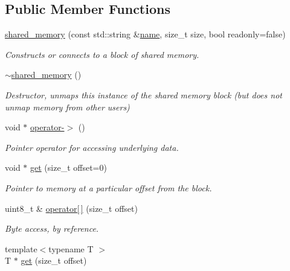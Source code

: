 \subsection*{Public Member Functions}
\begin{DoxyCompactItemize}
\item 
\hyperlink{classcpen333_1_1process_1_1windows_1_1shared__memory_a3a2044ba961f9fc394e166273a3efa20}{shared\+\_\+memory} (const std\+::string \&\hyperlink{classcpen333_1_1process_1_1impl_1_1named__resource__base_ae0c5fbb1843afe863cece4b51c38f807}{name}, size\+\_\+t size, bool readonly=false)
\begin{DoxyCompactList}\small\item\em Constructs or connects to a block of shared memory. \end{DoxyCompactList}\item 
\hyperlink{classcpen333_1_1process_1_1windows_1_1shared__memory_a6355690147ae22f25d4bceed8ad63011}{$\sim$shared\+\_\+memory} ()
\begin{DoxyCompactList}\small\item\em Destructor, unmaps this instance of the shared memory block (but does not unmap memory from other users) \end{DoxyCompactList}\item 
void $\ast$ \hyperlink{classcpen333_1_1process_1_1windows_1_1shared__memory_a2afcb6ba09ba1039c2e03efb471d3b28}{operator-\/$>$} ()
\begin{DoxyCompactList}\small\item\em Pointer operator for accessing underlying data. \end{DoxyCompactList}\item 
void $\ast$ \hyperlink{classcpen333_1_1process_1_1windows_1_1shared__memory_a3bbd718728dc2fa2fbe4058b8a207594}{get} (size\+\_\+t offset=0)
\begin{DoxyCompactList}\small\item\em Pointer to memory at a particular offset from the block. \end{DoxyCompactList}\item 
uint8\+\_\+t \& \hyperlink{classcpen333_1_1process_1_1windows_1_1shared__memory_a931719bdcc1558973d6fcb7a79f52f22}{operator\mbox{[}$\,$\mbox{]}} (size\+\_\+t offset)
\begin{DoxyCompactList}\small\item\em Byte access, by reference. \end{DoxyCompactList}\item 
{\footnotesize template$<$typename T $>$ }\\T $\ast$ \hyperlink{classcpen333_1_1process_1_1windows_1_1shared__memory_a2f2fa53c705df531b6126ed2da84c347}{get} (size\+\_\+t offset)

\end{DoxyCompactItemize}
